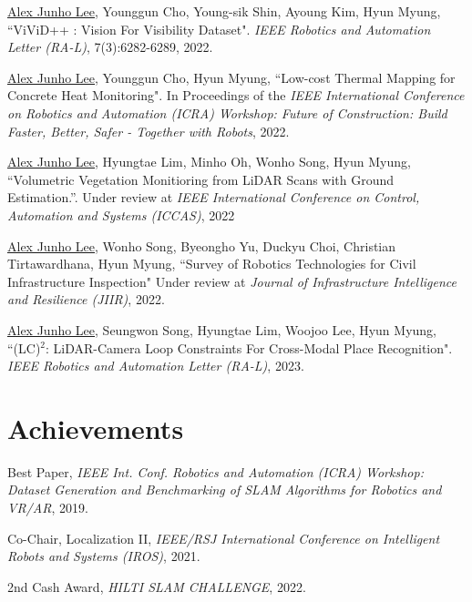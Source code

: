 \documentclass[margin]{res}
\begin{document}
\begin{resume}
		\par\underline{Alex Junho Lee}, Younggun Cho, Young-sik Shin, Ayoung Kim, Hyun Myung, ``ViViD++ : Vision For Visibility Dataset". \textit{IEEE Robotics and Automation Letter (RA-L)}, 7(3):6282-6289, 2022.
			
		\par\underline{Alex Junho Lee}, Younggun Cho, Hyun Myung, ``Low-cost Thermal Mapping for Concrete Heat Monitoring". In Proceedings of the \textit{IEEE International Conference on Robotics and Automation (ICRA) Workshop: Future of Construction: Build Faster, Better, Safer - Together with Robots}, 2022.
		
		\par\underline{Alex Junho Lee}, Hyungtae Lim, Minho Oh, Wonho Song, Hyun Myung, ``Volumetric Vegetation Monitioring from LiDAR Scans with Ground Estimation.''. Under review at \textit{IEEE International Conference on Control, Automation and Systems (ICCAS)}, 2022
		
		\par\underline{Alex Junho Lee}, Wonho Song, Byeongho Yu, Duckyu Choi, Christian Tirtawardhana, Hyun Myung, ``Survey of Robotics Technologies for Civil Infrastructure Inspection" Under review at \textit{Journal of Infrastructure Intelligence and Resilience (JIIR)}, 2022.
			
		\par\underline{Alex Junho Lee}, Seungwon Song, Hyungtae Lim, Woojoo Lee, Hyun Myung, ``(LC)$^2$: LiDAR-Camera Loop Constraints
		For Cross-Modal Place Recognition". \textit{IEEE Robotics and Automation Letter (RA-L)}, 2023.
		
		\newpage
		
		\section{Achievements}
		
		\par Best Paper,\textit{ IEEE Int. Conf. Robotics and Automation (ICRA) Workshop: Dataset Generation and Benchmarking of SLAM Algorithms for Robotics and VR/AR}, 2019.
						
		\par Co-Chair, Localization II, \textit{IEEE/RSJ International Conference on Intelligent Robots and Systems (IROS)}, 2021.
		
		\par 2nd Cash Award, \textit{HILTI SLAM CHALLENGE}, 2022.
		

\end{resume}
\end{document}
